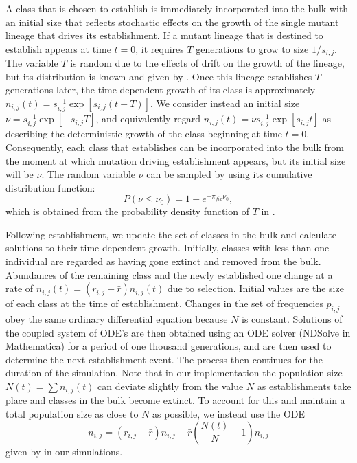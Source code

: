 \documentclass[9pt,twocolumn,twoside]{gsajnl}
\begin{document}
A class that is chosen to establish is immediately incorporated into the bulk with an initial size that reflects stochastic effects on the growth of the single mutant lineage that drives its establishment. If a mutant lineage that is destined to establish appears at time $t=0$, it requires $T$ generations to grow to size $1/s_{i,j}$. The variable $T$ is random due to the effects of drift on the growth of the lineage, but its distribution is known and given by \cite[Equation 12]{desai2007beneficial}.  Once this lineage establishes $T$ generations later, the time dependent growth of its class is approximately $n_{i,j}(t) =s_{i,j}^{-1} \exp[{s_{i,j}(t-T)}]$. We consider instead an initial size  $\nu = s_{i,j}^{-1}\exp[-s_{i,j}T]$, and equivalently regard $n_{i,j}(t) = \nu s_{i,j}^{-1} \exp[{s_{i,j}t}] $ as describing the deterministic growth of the class beginning at time $t=0$. Consequently, each class that establishes can be incorporated into the bulk from the moment at which mutation driving establishment appears, but its initial size will be $\nu$. The random variable $\nu$ can be sampled by using its cumulative distribution function:
\begin{equation}\label{eq:3}
P(\nu \leq \nu_0) = 1- e^{-\pi_{fix} \nu_0},
\end{equation}
which is obtained from the probability density function of  $T$ in \cite[Equation 12]{desai2007beneficial}.  

Following establishment, we update the set of classes in the bulk and calculate solutions to their time-dependent growth. Initially, classes with less than one individual are regarded as having gone extinct and removed from the bulk. Abundances of the remaining class and the newly established one change at a rate of  $\dot{n}_{i,j}(t) =(r_{i,j}-\bar{r})n_{i,j}(t)$ due to selection. Initial values are the size of each class at the time of establishment. Changes in the set of frequencies $p_{i,j}$ obey the same ordinary differential equation because $N$ is constant. Solutions of the coupled system of ODE's are then obtained using an ODE solver (NDSolve in Mathematica) for a period of one thousand generations, and are then used to determine the next establishment event. The process then continues for the duration of the simulation. Note that in our implementation the population size $N(t)=\sum n_{i,j}(t)$ can deviate slightly from the value $N$ as establishments take place and classes in the bulk become extinct. To account for this and maintain a total population size as close to $N$ as possible, we instead use the ODE 
\[ \dot{n}_{i,j} = (r_{i,j}-\bar{r})n_{i,j} - \bar{r}\left (\frac{N(t)}{N}-1 \right)n_{i,j} \] 
given by \cite[p.133]{Crow1970} in our simulations.\par
\end{document}
